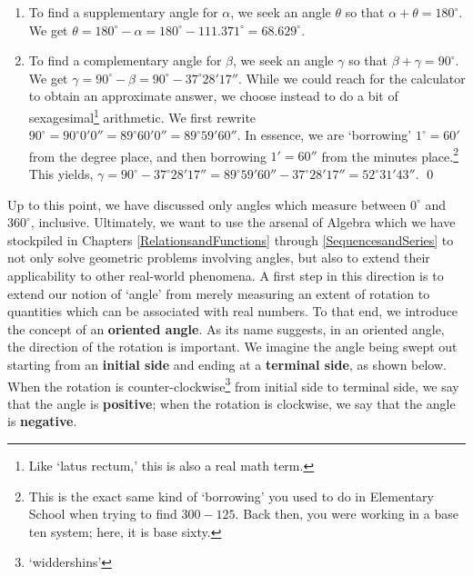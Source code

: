 \documentclass[12pt]{ximera}
\begin{document}
\begin{example}
\begin{enumerate}
\item  To find a supplementary angle for $\alpha$, we seek an angle $\theta$ so that $\alpha + \theta = 180^{\circ}$.  We get $\theta = 180^{\circ} - \alpha =  180^{\circ} - 111.371^{\circ} = 68.629^{\circ}$.

\item  To find a complementary  angle for $\beta$, we seek an angle $\gamma$ so that $\beta + \gamma = 90^{\circ}$.  We get $\gamma = 90^{\circ} - \beta =  90^{\circ} - 37^{\circ}28'17''$.  While we could reach for the calculator to obtain an approximate answer, we choose instead to do a bit of sexagesimal\footnote{Like `latus rectum,' this is also a real math term.} arithmetic.  We first rewrite  $90^{\circ} = 90^{\circ} 0' 0'' =  89^{\circ}60' 0'' =  89^{\circ}59'60''$. In essence, we are `borrowing' $1^{\circ} = 60'$ from the degree place,  and then borrowing $1' = 60''$ from the minutes place.\footnote{This is the exact same kind of `borrowing' you used to do in Elementary School when trying to find $300 - 125$. Back then, you were working in a base ten system;  here, it is base sixty.} This yields, $\gamma = 90^{\circ} - 37^{\circ}28'17'' = 89^{\circ}59'60'' - 37^{\circ}28'17'' = 52^{\circ}31'43''$.  \qed

\end{enumerate}

\end{example}
 

Up to this point, we have discussed only angles which measure between $0^{\circ}$ and $360^{\circ}$, inclusive.  Ultimately, we want to use the arsenal of Algebra which we have stockpiled in Chapters \ref{RelationsandFunctions} through \ref{SequencesandSeries} to not only solve geometric problems involving angles, but also to extend their applicability to other real-world phenomena.  A first step in this direction is to extend our notion of `angle' from merely measuring an extent of rotation to quantities which can be associated with real numbers.  To that end, we introduce the concept of an \textbf{oriented angle}.  As its name suggests, in an oriented angle, the direction of the rotation is important.  We imagine the angle being swept out starting from an \textbf{initial side} and ending at a \textbf{terminal side}, as shown below.  When the rotation is counter-clockwise\footnote{`widdershins'} from initial side to terminal side, we say that the angle is \textbf{positive}; when the rotation is clockwise, we say that the angle is \textbf{negative}.
\end{document}
